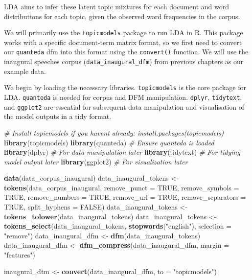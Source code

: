 \documentclass[
]{book}
\newenvironment{Shaded}{\begin{snugshade}}{\end{snugshade}}
\newcommand{\AttributeTok}[1]{\textcolor[rgb]{0.13,0.29,0.53}{#1}}
\newcommand{\CommentTok}[1]{\textcolor[rgb]{0.56,0.35,0.01}{\textit{#1}}}
\newcommand{\ConstantTok}[1]{\textcolor[rgb]{0.56,0.35,0.01}{#1}}
\newcommand{\FunctionTok}[1]{\textcolor[rgb]{0.13,0.29,0.53}{\textbf{#1}}}
\newcommand{\NormalTok}[1]{#1}
\newcommand{\OtherTok}[1]{\textcolor[rgb]{0.56,0.35,0.01}{#1}}
\newcommand{\StringTok}[1]{\textcolor[rgb]{0.31,0.60,0.02}{#1}}
\begin{document}
LDA aims to infer these latent topic mixtures for each document and word distributions for each topic, given the observed word frequencies in the corpus.

We will primarily use the \texttt{topicmodels} package to run LDA in R.
This package works with a specific document-term matrix format, so we first need to convert our \texttt{quanteda} dfm into this format using the \texttt{convert()} function.
We will use the inaugural speeches corpus (\texttt{data\_inaugural\_dfm}) from previous chapters as our example data.

We begin by loading the necessary libraries.
\texttt{topicmodels} is the core package for LDA.
\texttt{quanteda} is needed for corpus and DFM manipulation.
\texttt{dplyr}, \texttt{tidytext}, and \texttt{ggplot2} are essential for subsequent data manipulation and visualisation of the model outputs in a tidy format.

\begin{Shaded}
\begin{Highlighting}[]
\CommentTok{\# Install topicmodels if you haven\textquotesingle{}t already: install.packages(\textquotesingle{}topicmodels\textquotesingle{})}
\FunctionTok{library}\NormalTok{(topicmodels)}
\FunctionTok{library}\NormalTok{(quanteda)  }\CommentTok{\# Ensure quanteda is loaded}
\FunctionTok{library}\NormalTok{(dplyr)  }\CommentTok{\# For data manipulation later}
\FunctionTok{library}\NormalTok{(tidytext)  }\CommentTok{\# For tidying model output later}
\FunctionTok{library}\NormalTok{(ggplot2)  }\CommentTok{\# For visualization later}


\FunctionTok{data}\NormalTok{(data\_corpus\_inaugural)}
\NormalTok{data\_inaugural\_tokens }\OtherTok{\textless{}{-}} \FunctionTok{tokens}\NormalTok{(data\_corpus\_inaugural, }\AttributeTok{remove\_punct =} \ConstantTok{TRUE}\NormalTok{, }\AttributeTok{remove\_symbols =} \ConstantTok{TRUE}\NormalTok{,}
    \AttributeTok{remove\_numbers =} \ConstantTok{TRUE}\NormalTok{, }\AttributeTok{remove\_url =} \ConstantTok{TRUE}\NormalTok{, }\AttributeTok{remove\_separators =} \ConstantTok{TRUE}\NormalTok{, }\AttributeTok{split\_hyphens =} \ConstantTok{FALSE}\NormalTok{)}
\NormalTok{data\_inaugural\_tokens }\OtherTok{\textless{}{-}} \FunctionTok{tokens\_tolower}\NormalTok{(data\_inaugural\_tokens)}
\NormalTok{data\_inaugural\_tokens }\OtherTok{\textless{}{-}} \FunctionTok{tokens\_select}\NormalTok{(data\_inaugural\_tokens, }\FunctionTok{stopwords}\NormalTok{(}\StringTok{"english"}\NormalTok{),}
    \AttributeTok{selection =} \StringTok{"remove"}\NormalTok{)}
\NormalTok{data\_inaugural\_dfm }\OtherTok{\textless{}{-}} \FunctionTok{dfm}\NormalTok{(data\_inaugural\_tokens)}
\NormalTok{data\_inaugural\_dfm }\OtherTok{\textless{}{-}} \FunctionTok{dfm\_compress}\NormalTok{(data\_inaugural\_dfm, }\AttributeTok{margin =} \StringTok{"features"}\NormalTok{)}

\NormalTok{inaugural\_dtm }\OtherTok{\textless{}{-}} \FunctionTok{convert}\NormalTok{(data\_inaugural\_dfm, }\AttributeTok{to =} \StringTok{"topicmodels"}\NormalTok{)}
\end{Highlighting}
\end{Shaded}
\end{document}
